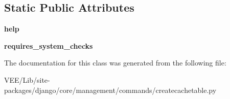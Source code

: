 \subsection*{Static Public Attributes}
\begin{DoxyCompactItemize}
\item 
\mbox{\label{classcreatecachetable_1_1_command_ad32b9f4d21634be112ef32a44d1fdb29}} 
{\bfseries help}
\item 
\mbox{\label{classcreatecachetable_1_1_command_ad2eea807e1fe2243c9e446a813cd1c1d}} 
{\bfseries requires\+\_\+system\+\_\+checks}
\end{DoxyCompactItemize}


The documentation for this class was generated from the following file\+:\begin{DoxyCompactItemize}
\item 
V\+E\+E/\+Lib/site-\/packages/django/core/management/commands/createcachetable.\+py\end{DoxyCompactItemize}

